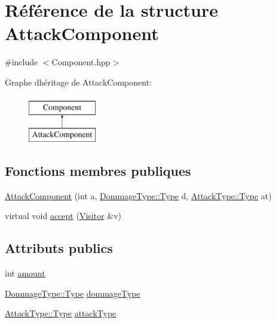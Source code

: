 \hypertarget{structAttackComponent}{}\section{Référence de la structure Attack\+Component}
\label{structAttackComponent}


{\ttfamily \#include $<$Component.\+hpp$>$}

Graphe d\textquotesingle{}héritage de Attack\+Component\+:\begin{figure}[H]
\begin{center}
\leavevmode
\includegraphics[height=2.000000cm]{structAttackComponent}
\end{center}
\end{figure}
\subsection*{Fonctions membres publiques}
\begin{DoxyCompactItemize}
\item 
\hyperlink{structAttackComponent_ab4d5e046930665a69f073554c3fad965}{Attack\+Component} (int a, \hyperlink{namespaceDommageType_a6e5dff665b7631fe6ec9065dddbebcfd}{Dommage\+Type\+::\+Type} d, \hyperlink{namespaceAttackType_a26a2d73c5f73a06a63a568dcd519d302}{Attack\+Type\+::\+Type} at)
\item 
virtual void \hyperlink{structAttackComponent_a6644fff9ad3be5bc7cd9571f811fe25e}{accept} (\hyperlink{classVisitor}{Visitor} \&v)
\end{DoxyCompactItemize}
\subsection*{Attributs publics}
\begin{DoxyCompactItemize}
\item 
int \hyperlink{structAttackComponent_a7af6243b23e8bdfec8eb75e267622b57}{amount}
\item 
\hyperlink{namespaceDommageType_a6e5dff665b7631fe6ec9065dddbebcfd}{Dommage\+Type\+::\+Type} \hyperlink{structAttackComponent_a324ca9d4107c8f2855d06a845228d29d}{dommage\+Type}
\item 
\hyperlink{namespaceAttackType_a26a2d73c5f73a06a63a568dcd519d302}{Attack\+Type\+::\+Type} \hyperlink{structAttackComponent_a672c95806b4aad77f6b0aaee6895611f}{attack\+Type}
\end{DoxyCompactItemize}


